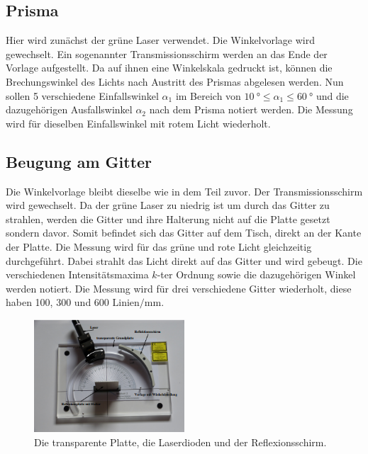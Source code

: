     \subsection{Prisma}
        Hier wird zunächst der grüne Laser verwendet.
        Die Winkelvorlage wird gewechselt.
        Ein sogenannter Transmissionsschirm werden an das Ende der Vorlage aufgestellt.
        Da auf ihnen eine Winkelskala gedruckt ist, können die Brechungswinkel des Lichts nach Austritt des Prismas abgelesen werden.
        Nun sollen 5 verschiedene Einfallswinkel $\alpha_1$ im Bereich von $\SI{10}{\degree} \leq \alpha_1 \leq \SI{60}{\degree} $ und die dazugehörigen Ausfallswinkel $\alpha_2$ nach dem Prisma notiert werden.
        Die Messung wird für dieselben Einfallswinkel mit rotem Licht wiederholt.

    \subsection{Beugung am Gitter}
        Die Winkelvorlage bleibt dieselbe wie in dem Teil zuvor.
        Der Transmissionsschirm wird gewechselt.
        Da der grüne Laser zu niedrig ist um durch das Gitter zu strahlen, werden die Gitter und ihre Halterung nicht auf die Platte gesetzt sondern davor.
        Somit befindet sich das Gitter auf dem Tisch, direkt an der Kante der Platte.
        Die Messung wird für das grüne und rote Licht gleichzeitig durchgeführt.
        Dabei strahlt das Licht direkt auf das Gitter und wird gebeugt.
        Die verschiedenen Intensitätsmaxima $k$-ter Ordnung sowie die dazugehörigen Winkel werden notiert.
        Die Messung wird für drei verschiedene Gitter wiederholt, diese haben 100, 300 und 600 $\text{Linien}/\si{\milli\metre}$.


        \begin{figure}
            \centering
            \includegraphics[width = 0.5\textwidth]{bilder/platte.PNG}
            \caption{Die transparente Platte, die Laserdioden und der Reflexionsschirm.\cite{anleitung}}
            \label{fig:platte}
        \end{figure}

